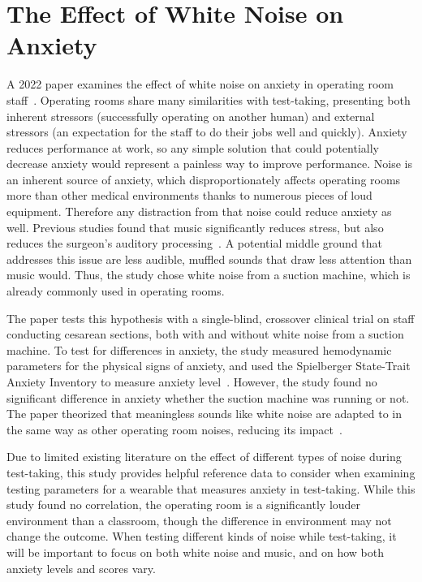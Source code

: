 \documentclass[journal]{IEEEtran}
\begin{document}
\section{The Effect of White Noise on Anxiety}
A 2022 paper examines the effect of white noise on anxiety in operating room staff~\cite{ShahrokhiShabnam2022Teow}. Operating rooms share many similarities with test-taking, presenting both inherent stressors (successfully operating on another human) and external stressors (an expectation for the staff to do their jobs well and quickly). Anxiety reduces performance at work, so any simple solution that could potentially decrease anxiety would represent a painless way to improve performance. Noise is an inherent source of anxiety, which disproportionately affects operating rooms more than other medical environments thanks to numerous pieces of loud equipment. Therefore any distraction from that noise could reduce anxiety as well. Previous studies found that music significantly reduces stress, but also reduces the surgeon's auditory processing~\cite[p.~2]{WayT.JustinMD2013EoNo}. A potential middle ground that addresses this issue are less audible, muffled sounds that draw less attention than music would. Thus, the study chose white noise from a suction machine, which is already commonly used in operating rooms.

The paper tests this hypothesis with a single-blind, crossover clinical trial on staff conducting cesarean sections, both with and without white noise from a suction machine. To test for differences in anxiety, the study measured hemodynamic parameters for the physical signs of anxiety, and used the Spielberger State-Trait Anxiety Inventory to measure anxiety level~\cite[pg.~1]{ShahrokhiShabnam2022Teow}. However, the study found no significant difference in anxiety whether the suction machine was running or not. The paper theorized that meaningless sounds like white noise are adapted to in the same way as other operating room noises, reducing its impact~\cite[pg.~3]{ShahrokhiShabnam2022Teow}.

Due to limited existing literature on the effect of different types of noise during test-taking, this study provides helpful reference data to consider when examining testing parameters for a wearable that measures anxiety in test-taking. While this study found no correlation, the operating room is a significantly louder environment than a classroom, though the difference in environment may not change the outcome. When testing different kinds of noise while test-taking, it will be important to focus on both white noise and music, and on how both anxiety levels and scores vary.
\end{document}
